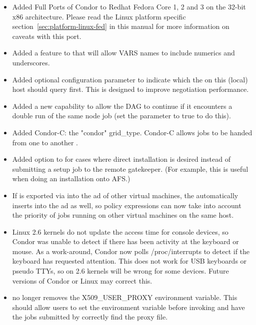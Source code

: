 \begin{itemize}

\item Added Full Ports of Condor to Redhat Fedora Core 1, 2 and 3 on
the 32-bit x86 architecture. 
Please read the Linux platform specific
section~\ref{sec:platform-linux-fed} in this manual for more information
on caveats with this port.

\item Added a feature to  that will allow VARS names to include
numerics and underscores.

\item Added optional  configuration parameter to indicate which  the   on this (local) host should query first. This is designed to improve negotiation performance.

\item Added a new  capability to allow the DAG to continue
if it encounters a double run of the same node job (set the
 parameter to true to do this).

\item Added Condor-C: the "condor" grid\_type.  Condor-C allows jobs to be handed from one  to another .

\item Added  option to  for cases where
direct installation is desired instead of submitting a setup job to the
remote gatekeeper.  (For example, this is useful when doing an installation
onto AFS.)

\item If  is exported via  into the
ad of other virtual machines, the  automatically inserts
 into the ad as well, so policy expressions can now take
into account the priority of jobs running on other virtual machines on the
same host.

\item Linux 2.6 kernels do not update the access time for console devices,
so Condor was unable to detect if there has been activity at the keyboard
or mouse. As a work-around, Condor now polls /proc/interrupts to detect
if the keyboard has requested attention. This does not work for USB keyboards
or pseudo TTYs, so  on 2.6 kernels will be wrong for some
devices. Future versions of Condor or Linux may correct this.

\item {} no longer removes the X509\_USER\_PROXY environment 
variable.
This should allow users to set the environment variable before invoking 
 and have the jobs submitted by  correctly
find the proxy file.

\end{itemize}


